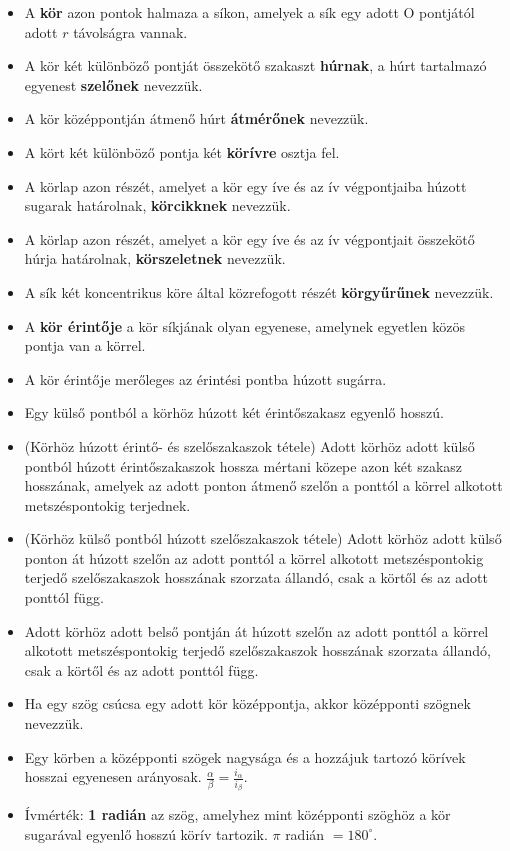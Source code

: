 \documentclass[a4paper,11pt]{article}
\begin{document}
\begin{itemize}
\item A \textbf{kör} azon pontok halmaza a síkon, amelyek a sík egy adott O pontjától adott $r$ távolságra vannak.
\item A kör két különböző pontját összekötő szakaszt \textbf{húrnak}, a húrt tartalmazó egyenest \textbf{szelőnek} nevezzük.
\item A kör középpontján átmenő húrt \textbf{átmérőnek} nevezzük.
\item A kört két különböző pontja két \textbf{körívre} osztja fel.
\item A körlap azon részét, amelyet a kör egy íve és az ív végpontjaiba húzott sugarak határolnak, \textbf{körcikknek} nevezzük.
\item A körlap azon részét, amelyet a kör egy íve és az ív végpontjait összekötő húrja határolnak, \textbf{körszeletnek} nevezzük.
\item A sík két koncentrikus köre által közrefogott részét \textbf{körgyűrűnek} nevezzük.
\item A \textbf{kör érintője} a kör síkjának olyan egyenese, amelynek egyetlen közös pontja van a körrel.
\item A kör érintője merőleges az érintési pontba húzott sugárra.
\item Egy külső pontból a körhöz húzott két érintőszakasz egyenlő hosszú.
\item (Körhöz húzott érintő- és szelőszakaszok tétele) Adott körhöz adott külső pontból húzott érintőszakaszok hossza mértani közepe azon két szakasz hosszának, amelyek az adott ponton átmenő szelőn a ponttól a körrel alkotott metszéspontokig terjednek.
\item (Körhöz külső pontból húzott szelőszakaszok tétele) Adott körhöz adott külső ponton át húzott szelőn az adott ponttól a körrel alkotott metszéspontokig terjedő szelőszakaszok hosszának szorzata állandó, csak a körtől és az adott ponttól függ.
\item Adott körhöz adott belső pontján át húzott szelőn az adott ponttól a körrel alkotott metszéspontokig terjedő szelőszakaszok hosszának szorzata állandó, csak a körtől és az adott ponttól függ.
\item Ha egy szög csúcsa egy adott kör középpontja, akkor középponti szögnek nevezzük.
\item Egy körben a középponti szögek nagysága és a hozzájuk tartozó körívek hosszai egyenesen arányosak. $\frac{\alpha}{\beta} = \frac{i_\alpha}{i_\beta}$.
\item Ívmérték: \textbf{1 radián} az szög, amelyhez mint középponti szöghöz a kör sugarával egyenlő hosszú körív tartozik. $\pi$ radián $= 180^\circ$.

\end{itemize}
\end{document}
